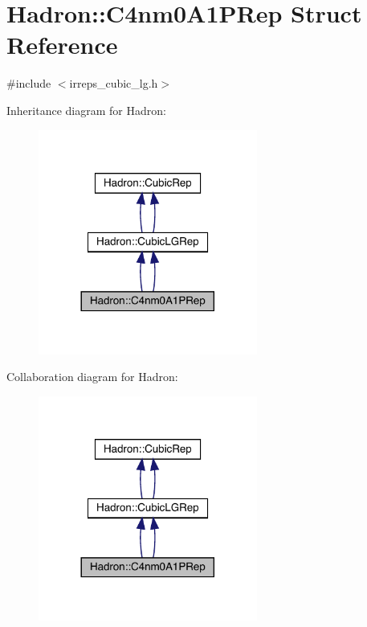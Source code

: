 \hypertarget{structHadron_1_1C4nm0A1PRep}{}\section{Hadron\+:\+:C4nm0\+A1\+P\+Rep Struct Reference}
\label{structHadron_1_1C4nm0A1PRep}


{\ttfamily \#include $<$irreps\+\_\+cubic\+\_\+lg.\+h$>$}



Inheritance diagram for Hadron\+:\nopagebreak
\begin{figure}[H]
\begin{center}
\leavevmode
\includegraphics[width=204pt]{d7/d8a/structHadron_1_1C4nm0A1PRep__inherit__graph}
\end{center}
\end{figure}


Collaboration diagram for Hadron\+:\nopagebreak
\begin{figure}[H]
\begin{center}
\leavevmode
\includegraphics[width=204pt]{d2/d39/structHadron_1_1C4nm0A1PRep__coll__graph}
\end{center}
\end{figure}
